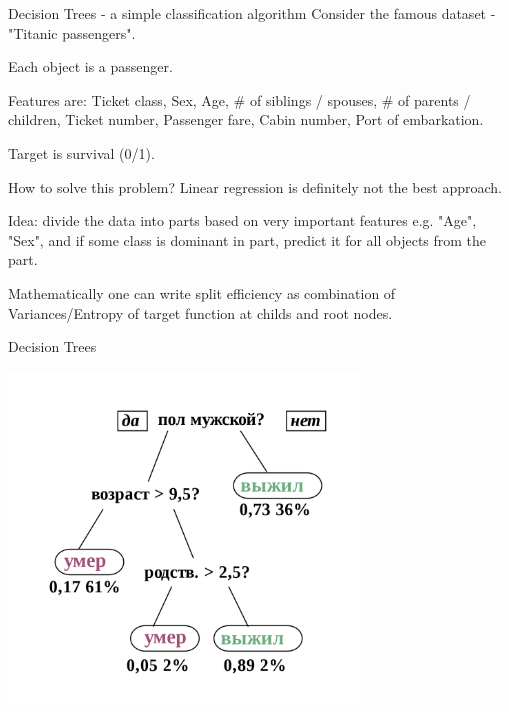 \documentclass{beamer}
\theoremstyle{remark}
\begin{document}
\begin{frame}{Decision Trees - a simple classification algorithm}
    Consider the famous dataset - "Titanic passengers".\vspace{0.1in}
    
    Each object is a passenger.\vspace{0.1in}
    
    Features are: Ticket class, Sex, Age, \# of siblings / spouses, \# of parents / children, Ticket number, Passenger fare, Cabin number, Port of embarkation.\vspace{0.1in}
    
    Target is survival (0/1).\vspace{0.1in}
    
    How to solve this problem? Linear regression is definitely not the best approach.\vspace{0.1in}
    
    Idea: divide the data into parts based on very important features e.g. "Age", "Sex", and if some class is dominant in part, predict it for all objects from the part.\vspace{0.1in}
    
    Mathematically one can write split efficiency as combination of Variances/Entropy of target function at childs and root nodes.
\end{frame}

\begin{frame}{Decision Trees}
    \begin{center}
    \includegraphics[width=0.7\textwidth]{pictures/titanic_decision_tree.png}
    \end{center}
\end{frame}
\end{document}
